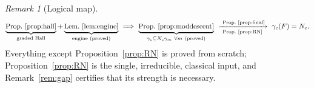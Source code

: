 \documentclass{amsart}
\theoremstyle{definition}
\theoremstyle{remark}
\newtheorem{remark}{Remark}
\begin{document}
\begin{remark}[Logical map]\label{rem:map}
\[
\underbrace{\text{Prop.\ \ref{prop:hall}}}_{\text{graded Hall}}
+\underbrace{\text{Lem.\ \ref{lem:engine}}}_{\text{engine (proved)}}
\ \Longrightarrow\
\underbrace{\text{Prop.\ \ref{prop:moddescent}}}_{\gamma_c\subseteq N_c\gamma_m\ \forall m\ (\text{proved})}
\ \xrightarrow[\ \text{Prop.\ \ref{prop:RN}}\ ]{\ \text{Prop.\ \ref{prop:final}}}\
\gamma_c(F)=N_c .
\]
Everything except Proposition~\ref{prop:RN} is proved from scratch;
Proposition~\ref{prop:RN} is the single, irreducible, classical input, and
Remark~\ref{rem:gap} certifies that its strength is necessary.
\end{remark}
\end{document}
